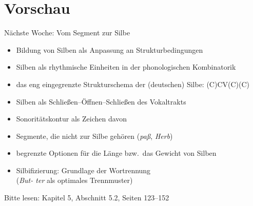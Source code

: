 \section{Vorschau}

\begin{frame}
  {Nächste Woche: Vom Segment zur Silbe}
  \pause
  \begin{itemize}[<+->]
    \item Bildung von Silben als Anpassung an Strukturbedingungen
    \item Silben als rhythmische Einheiten in der phonologischen Kombinatorik
    \item das eng eingegrenzte Strukturschema der (deutschen) Silbe: (C)CV(C)(C)
    \item Silben als Schließen--Öffnen--Schließen des Vokaltrakts
    \item Sonoritätskontur als Zeichen davon
    \item Segmente, die nicht zur Silbe gehören (\textit{paß}, \textit{Herb})
    \item begrenzte Optionen für die \alert{Länge} bzw.\ das \alert{Gewicht} von Silben
    \item Silbifizierung: Grundlage der Wortrennung\\
      (\textit{But- ter} als optimales Trennmuster)
  \end{itemize}
  \pause
  \Zeile
  \centering
  \Large
  \alert{Bitte lesen: Kapitel 5, Abschnitt 5.2, Seiten 123--152}
  \pause
  \pause
  \pause
  \pause
  \pause
\end{frame}

